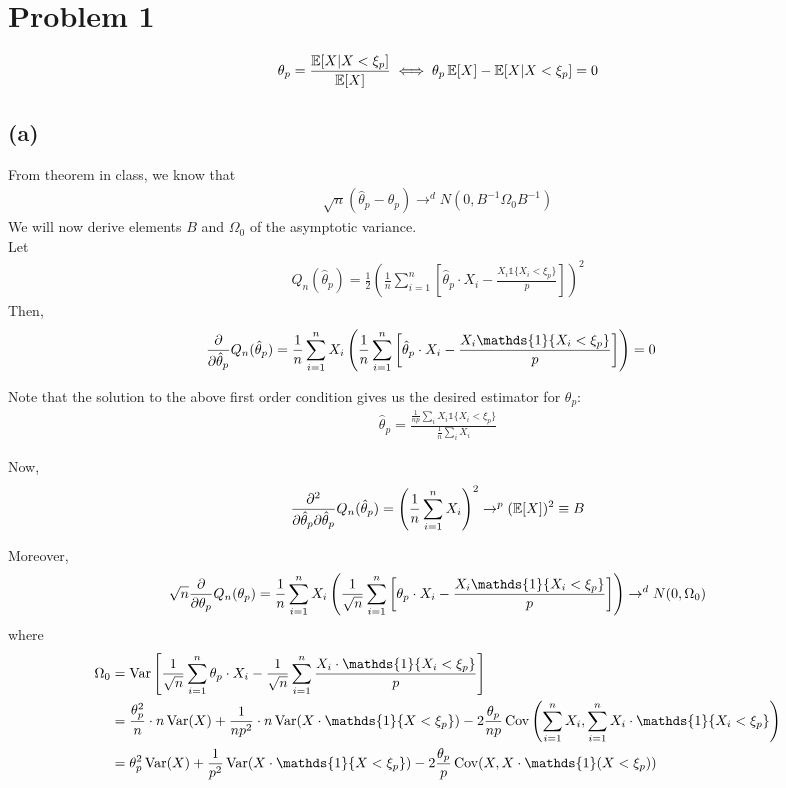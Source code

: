 \documentclass[../PSET1Tamer.tex]{subfiles}
\begin{document}
 
\section*{Problem 1}

\begin{align*}
  \theta_p = \frac{\operatorname{\mathbb{E}}[X|X<\xi_p]}{\operatorname{\mathbb{E}}[X]} \iff \theta_p \operatorname{\mathbb{E}}[X] - \operatorname{\mathbb{E}}[X|X<\xi_p] = 0
\end{align*} 
\subsection*{(a)}
From theorem in class, we know that
\begin{align}
	\sqrt{n}(\hat{\theta}_p - \theta_p) \to^d N(0, B^{-1}\Omega_0B^{-1})
\end{align}
We will now derive elements $B$ and $\Omega_0$ of the asymptotic variance. \\

Let 
\begin{align}
	Q_n(\hat{\theta}_p) = \frac{1}{2}\left(\frac{1}{n}\sum_{i=1}^n \left[\hat{\theta}_p \cdot X_i - \frac{X_i \mathds{1}\{X_i < \xi_p\}}{p}\right]  \right)^2
\end{align}
Then,
\begin{align}
		 &\pdv{}{\hat{\theta}_p}Q_n(\hat{\theta}_p) = \frac{1}{n}\sum_{i=1}^n X_i \left(\frac{1}{n}\sum_{i=1}^n \left[\hat{\theta}_p \cdot X_i - \frac{X_i \mathds{1}\{X_i < \xi_p\}}{p}\right] \right) = 0
\end{align}

Note that the solution to the above first order condition gives us the desired estimator for $\theta_p$:
\begin{align*}
	\hat{\theta}_p = \frac{\frac{1}{np}\sum_{i} X_i \mathds{1}\{X_i<\xi_p\}}{\frac{1}{n}\sum_{i}X_i}
\end{align*}
	
Now, 
\begin{align*}
	\pdv{}{\hat{\theta}_p}{\hat{\theta}_p}Q_n(\hat{\theta}_p) = \left(\frac{1}{n}\sum_{i=1}^n X_i\right)^2 \to^p (\operatorname{\mathbb{E}}[X])^2 \equiv B
\end{align*}

Moreover,
\begin{align*}
	\sqrt{n}\pdv{}{\theta_p}Q_n(\theta_p) = \frac{1}{n}\sum_{i=1}^n X_i \left(\frac{1}{\sqrt{n}}\sum_{i=1}^n \left[\theta_p \cdot X_i - \frac{X_i \mathds{1}\{X_i < \xi_p\}}{p}\right] \right) \to^d N(0, \Omega_0)
\end{align*}
where
\begin{align*}
	\Omega_0 &= \Var\left[\frac{1}{\sqrt{n}}\sum_{i=1}^n \theta_p \cdot X_i - \frac{1}{\sqrt{n}}\sum_{i=1}^n\frac{X_i \cdot\mathds{1}\{X_i < \xi_p\}}{p} \right]\\
	&= \frac{\theta_p^2} {n} \cdot n\Var(X) + \frac{1}{np^2}\cdot n \Var(X\cdot\mathds{1}\{X < \xi_p\}) - 2\frac{\theta_p}{np}\Cov\left(\sum_{i=1}^n X_i, \sum_{i=1}^n X_i\cdot\mathds{1}\{X_i < \xi_p\}\right) \\
	&= \theta_p^2\Var(X) + \frac{1}{p^2} \Var(X \cdot\mathds{1}\{X < \xi_p\}) - 2\frac{\theta_p}{p}\Cov(X, X\cdot\mathds{1}(X < \xi_p))
\end{align*}
\end{document}

